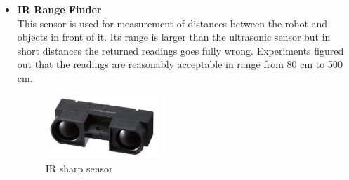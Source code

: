 \documentclass[12pt]{article}
\begin{document}
\begin{itemize}
	\item \textbf{IR Range Finder}\\
	This sensor is used for measurement of distances between the robot and objects in front of it. Its range is larger than the ultrasonic sensor but in short distances the returned readings goes fully wrong. Experiments figured out that the readings are reasonably acceptable in range from 80 cm to 500 cm.
	\begin{figure}[H]
		\centering
		\includegraphics[width =0.4\textwidth]{Fig/Electronics/ir.jpg}
		\caption{IR sharp sensor}
		\label{fig:ir}
	\end{figure}
\end{itemize}

\newpage
\end{document}
